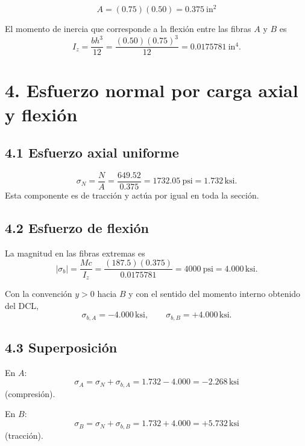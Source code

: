 \documentclass[11pt]{article}
\newcommand{\ksi}{\,\mathrm{ksi}}
\begin{document}
\[
A=(0.75)(0.50)=\boxed{0.375\ \mathrm{in^2}}
\]

El momento de inercia que corresponde a la flexi\'on entre las fibras $A$ y $B$ es
\[
I_z=\frac{b h^3}{12}
=\frac{(0.50)(0.75)^3}{12}
=\boxed{0.0175781\ \mathrm{in^4}}.
\]

\section*{4. Esfuerzo normal por carga axial y flexi\'on}

\subsection*{4.1 Esfuerzo axial uniforme}
\[
\sigma_N=\frac{N}{A}
=\frac{649.52}{0.375}
=1732.05\ \mathrm{psi}
=\boxed{1.732\ksi}.
\]
Esta componente es de tracci\'on y act\'ua por igual en toda la secci\'on.

\subsection*{4.2 Esfuerzo de flexi\'on}
La magnitud en las fibras extremas es
\[
|\sigma_b|=\frac{Mc}{I_z}
=\frac{(187.5)(0.375)}{0.0175781}
=4000\ \mathrm{psi}
=\boxed{4.000\ksi}.
\]

Con la convenci\'on $y>0$ hacia $B$ y con el sentido del momento interno obtenido del DCL,
\[
\boxed{\sigma_{b,A}=-4.000\ksi},
\qquad
\boxed{\sigma_{b,B}=+4.000\ksi}.
\]

\subsection*{4.3 Superposici\'on}
En $A$:
\[
\boxed{\sigma_A=\sigma_N+\sigma_{b,A}=1.732-4.000=-2.268\ksi}
\]
(compresi\'on).

En $B$:
\[
\boxed{\sigma_B=\sigma_N+\sigma_{b,B}=1.732+4.000=+5.732\ksi}
\]
(tracci\'on).

\begin{center}
\end{center}
\end{document}

